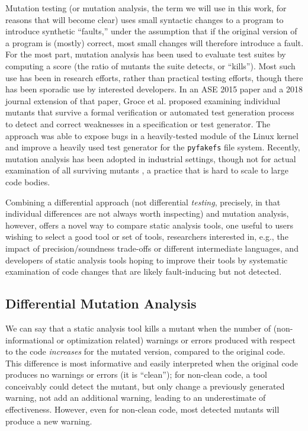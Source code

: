 Mutation testing \cite{jia2011analysis,demillo1978hints,budd1980theoretical} (or mutation analysis, the term we will use in this work, for reasons that will become clear) uses small syntactic changes to a program to introduce synthetic ``faults,'' under the assumption that if the original version of a program is (mostly) correct, most small changes will therefore introduce a fault.  For the most part, mutation analysis has been used to evaluate test suites by computing a score (the ratio of mutants the suite detects, or ``kills'').  Most such use has been in research efforts, rather than practical testing efforts, though there has been sporadic use by interested developers.
In an ASE 2015 \cite{groce2015verified} paper and a 2018 journal extension \cite{groce2018verified} of that paper, Groce et al. proposed examining individual mutants that survive a formal verification or automated test generation process to detect and correct weaknesses in a specification or test generator.  The approach was able to expose bugs in a heavily-tested module of the Linux kernel \cite{mutKernel} and improve a heavily used test generator for the {\tt pyfakefs} file system.  Recently, mutation analysis has been adopted in industrial settings, though not for actual examination of all surviving mutants \cite{MutGoogle,ivankovic2018industrial}, a practice that is hard to scale to large code bodies.

Combining a differential approach (not differential \emph{testing}, precisely, in that individual differences are not always worth inspecting) and mutation analysis, however, offers a novel way to compare static analysis tools, one useful to users wishing to select a good tool or set of tools, researchers interested in, e.g., the impact of precision/soundness trade-offs or different intermediate languages, and developers of static analysis tools hoping to improve their tools by systematic examination of code changes that are likely fault-inducing but not detected.

\subsection{Differential Mutation Analysis}

We can say that a static analysis tool kills a mutant when the number of (non-informational or optimization related) warnings or errors produced with respect to the code \emph{increases} for the mutated version, compared to the original code.  This difference is most informative and easily interpreted when the original code produces no warnings or errors (it is ``clean''); for non-clean code, a tool conceivably could detect the mutant, but only change a previously generated warning, not add an additional warning, leading to an underestimate of effectiveness.  However, even for non-clean code, most detected mutants will produce a new warning.

